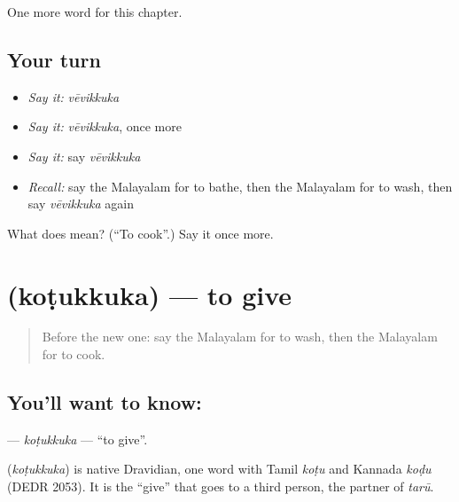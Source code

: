 \begin{grammarlens}[title={What you've built}]
One more word for this chapter.
\end{grammarlens}

\subsection*{Your turn}
\begin{itemize}
\raggedright
  \item \emph{Say it:} \emph{vēvikkuka}
  \item \emph{Say it:} \emph{vēvikkuka}, once more
  \item \emph{Say it:} say \emph{vēvikkuka}
  \item \emph{Recall:} say the Malayalam for to bathe, then the Malayalam for to wash, then say \emph{vēvikkuka} again
\end{itemize}

\begin{tcolorbox}[breakable,colback=teal!4,colframe=teal!35!black,title={Before you move on}]
What does  mean? (\textquotedblleft{}To cook\textquotedblright{}.) Say it once more.
\end{tcolorbox}
\section[\texorpdfstring{\ml{കൊടുക്കുക} (koṭukkuka)}{കൊടുക്കുക (koṭukkuka)}]{ (koṭukkuka) — to give}

\label{lesson:ML-C172-kotukkuka}



\begin{quote}
Before the new one: say the Malayalam for to wash, then the Malayalam for to cook.
\end{quote}

\subsection*{You'll want to know: }
\textbf{} — \emph{koṭukkuka} — \textquotedblleft{}to give\textquotedblright{}.

\begin{cousinweb}
\textbf{} (\emph{koṭukkuka}) is native Dravidian, one word with Tamil \emph{koṭu} and Kannada \emph{koḍu} (DEDR 2053). It is the \textquotedblleft{}give\textquotedblright{} that goes to a third person, the partner of \emph{tarū}.
\end{cousinweb}

